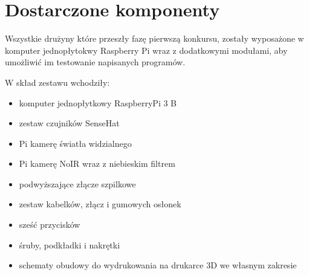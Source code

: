 \section{Dostarczone komponenty}\label{sec:cover_introduction}

Wszystkie drużyny które przeszły fazę pierwszą konkursu, zostały wyposażone
w komputer jednopłytokwy Raspberry Pi wraz z dodatkowymi modułami, aby umożliwić im
testowanie napisanych programów.

W skład zestawu wchodziły:
\begin{itemize}
    \item komputer jednopłytkowy RaspberryPi 3 B
    \item zestaw czujników SenseHat
    \item Pi kamerę światła widzialnego
    \item Pi kamerę NoIR wraz z niebieskim filtrem
    \item podwyższające złącze szpilkowe
    \item zestaw kabelków, złącz i gumowych osłonek
    \item sześć przycisków
    \item śruby, podkładki i nakrętki
    \item schematy obudowy do wydrukowania na drukarce 3D we własnym zakresie
\end{itemize}

